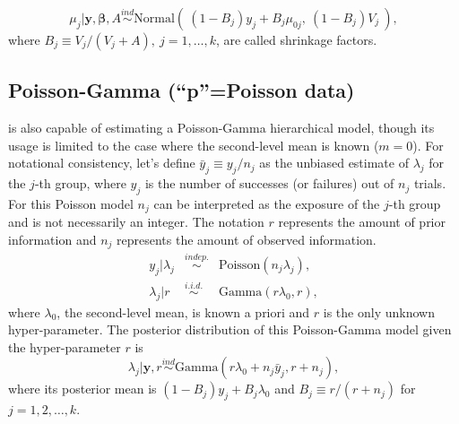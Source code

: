 \documentclass[article]{jss}
\begin{document}
\begin{equation} \label{normalpost}
\mu_{j}\vert \boldsymbol{y}, \boldsymbol{\beta}, A \stackrel{ind}{\sim}\textrm{Normal}(~(1-B_{j})y_{j} + B_{j}\mu_{0j},~(1-B_{j})V_{j}~),
\end{equation}
where $B_{j}\equiv V_{j}/(V_{j} + A),~j=1, \ldots, k$, are called shrinkage factors. 


\subsection[Poisson-Gamma]{Poisson-Gamma (``p''=Poisson data)}\label{poissonsubsec}
 is also capable of estimating a Poisson-Gamma hierarchical model, though its usage is limited to the case where the second-level mean is known ($m=0$). For notational consistency, let's define $\bar{y}_{j}\equiv y_{j} / n_{j}$ as the unbiased estimate of $\lambda_{j}$ for the $j$-th group, where  $y_{j}$ is the number of successes (or failures) out of $n_{j}$ trials. For this Poisson model $n_{j}$ can be interpreted as the exposure of the $j$-th group and is not necessarily an integer. The notation $r$ represents the amount of prior information and $n_{j}$ represents the amount of observed information. 
\begin{eqnarray}
y_j\vert \lambda_j &\stackrel{indep.}{\sim} & \textrm{Poisson}(n_{j}\lambda_{j}),\\
\lambda_{j}\vert r &\stackrel{i.i.d.}{\sim}& \textrm{Gamma}(r\lambda_{0}, r),
\end{eqnarray}
where $\lambda_{0}$, the second-level mean, is known a priori and $r$ is the only unknown hyper-parameter. The posterior distribution of this Poisson-Gamma model given the hyper-parameter $r$ is
\begin{equation} \label{gammapost}
\lambda_j\vert \boldsymbol{y}, r \stackrel{ind}{\sim}\textrm{Gamma}(r\lambda_{0} + n_{j}\bar{y}_{j}, r + n_j),\end{equation}
where its posterior mean is $(1-B_{j})y_{j} + B_{j}\lambda_{0}$ and   $B_{j}\equiv r / (r+n_{j})$ for $j=1, 2, \ldots, k$. 
\end{document}
